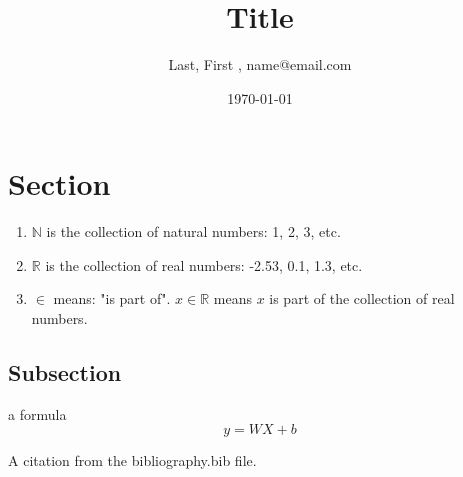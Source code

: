 \documentclass[10pt]{article}
\title{Title}
\author{Last, First , name@email.com}
\date{\today}
\begin{document}
\maketitle
\section{Section}
\begin{enumerate}
\item $\mathbb{N}$ is the collection of natural numbers: 1, 2, 3, etc.
\item $\mathbb{R}$ is the collection of real numbers: -2.53, 0.1, 1.3, etc.
\item $\in$ means: "is part of". $x \in \mathbb{R}$ means $x$ is part of the collection of real numbers.
\end{enumerate}


\subsection{Subsection}
a formula 
\begin{equation}
y = WX + b
\end{equation}

A citation \cite{attention2017} from the bibliography.bib file.




\end{document}
